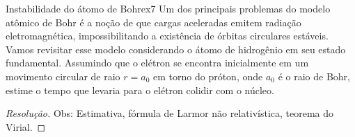 \begin{exercício}{Instabilidade do átomo de Bohr}{ex7}
    Um dos principais problemas do modelo atômico de Bohr é a noção de que cargas aceleradas emitem radiação eletromagnética, impossibilitando a existência de órbitas circulares estáveis. Vamos revisitar esse modelo considerando o átomo de hidrogênio em seu estado fundamental. Assumindo que o elétron se encontra inicialmente em um movimento circular de raio \(r = a_0\) em torno do próton, onde \(a_0\) é o raio de Bohr, estime o tempo que levaria para o elétron colidir com o núcleo.
\end{exercício}
\begin{proof}[Resolução]
    Obs: Estimativa, fórmula de Larmor não relativística, teorema do Virial.
\end{proof}
